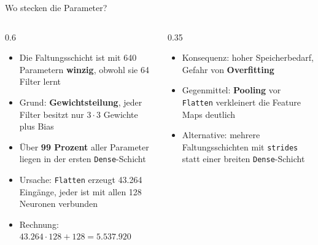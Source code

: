 \begin{frame}{Wo stecken die Parameter?}
\begin{columns}
\begin{column}{0.6\linewidth}
\begin{itemize}
  \item Die Faltungsschicht ist mit 640 Parametern \textbf{winzig}, obwohl sie 64 Filter lernt
  \item Grund: \textbf{Gewichtsteilung}, jeder Filter besitzt nur $3 \cdot 3$ Gewichte plus Bias
  \item Über \textbf{99 Prozent} aller Parameter liegen in der ersten \texttt{Dense}-Schicht
  \item Ursache: \texttt{Flatten} erzeugt 43.264 Eingänge, jeder ist mit allen 128 Neuronen verbunden
  \item Rechnung: $43{.}264 \cdot 128 + 128 = 5{.}537{.}920$
\end{itemize}
\end{column}
\begin{column}{0.35\linewidth}
\begin{itemize}
  \item Konsequenz: hoher Speicherbedarf, Gefahr von \textbf{Overfitting}
  \item Gegenmittel: \textbf{Pooling} vor \texttt{Flatten} verkleinert die Feature Maps deutlich
  \item Alternative: mehrere Faltungsschichten mit \texttt{strides} statt einer breiten \texttt{Dense}-Schicht
\end{itemize}
\end{column}
\end{columns}
\end{frame}


